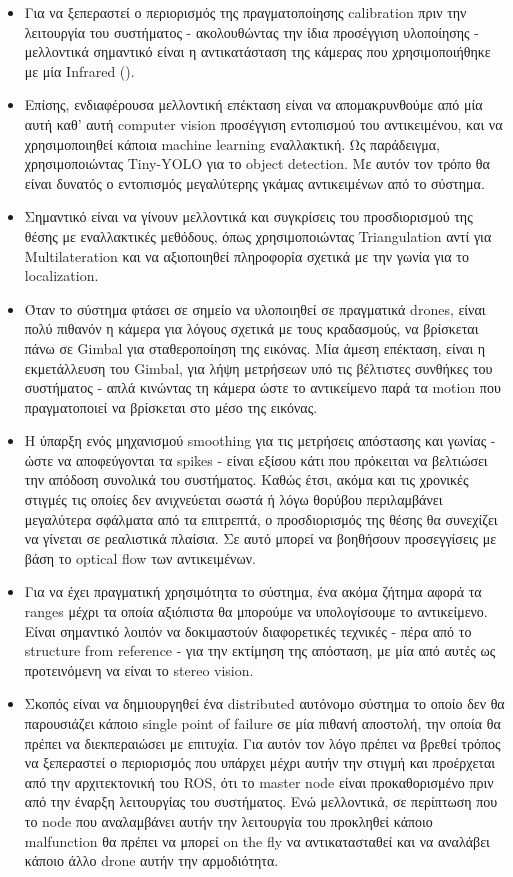 \begin{itemize}
    \item Για να ξεπεραστεί ο περιορισμός της πραγματοποίησης calibration πριν την λειτουργία του συστήματος - ακολουθώντας την ίδια προσέγγιση υ\-λο\-ποίη\-σης - μελλοντικά σημαντικό είναι η αντικατάσταση της κάμερας που χρησιμοποιήθηκε με μία Infrared ().
    \item Επίσης, ενδιαφέρουσα μελλοντική επέκταση είναι να απομακρυνθούμε από μία αυτή καθ' αυτή computer vision προσέγγιση εντοπισμού του αντικειμένου, και να χρησιμοποιηθεί κάποια machine learning εναλλακτική. Ως παράδειγμα, χρησιμοποιώντας Tiny-YOLO για το object detection. Με αυτόν τον τρόπο θα είναι δυνατός ο εντοπισμός μεγαλύτερης γκάμας αντικειμένων από το σύστημα.
    \item Σημαντικό είναι να γίνουν μελλοντικά και συγκρίσεις του προσδιορισμού της θέσης με εναλλακτικές μεθόδους, όπως χρησιμοποιώντας Triangulation αντί για Multilateration και να αξιοποιηθεί πληροφορία σχετικά με την γωνία για το localization.
    \item Όταν το σύστημα φτάσει σε σημείο να υλοποιηθεί σε πραγματικά drones, είναι πολύ πιθανόν η κάμερα για λόγους σχετικά με τους κραδασμούς, να βρίσκεται πάνω σε Gimbal για σταθεροποίηση της εικόνας. Μία άμεση επέκταση, είναι η εκμετάλλευση του Gimbal, για λήψη μετρήσεων υπό τις βέλτιστες συ\-νθή\-κες του συστήματος - απλά κινώντας τη κάμερα ώστε το αντικείμενο παρά τα motion που πραγματοποιεί να βρίσκεται στο μέσο της εικόνας.
    \item Η ύπαρξη ενός μηχανισμού smoothing για τις μετρήσεις απόστασης και γωνίας - ώστε να αποφεύγονται τα spikes - είναι εξίσου κάτι που πρόκειται να βελτιώσει την απόδοση συνολικά του συστήματος. Καθώς έτσι, ακόμα και τις χρονικές στιγμές τις οποίες δεν ανιχνεύεται σωστά ή λόγω θορύβου περιλαμβάνει με\-γα\-λύ\-τε\-ρα σφάλματα από τα επιτρεπτά, ο προσδιορισμός της θέσης θα συνεχίζει να γίνεται σε ρεαλιστικά πλαίσια. Σε αυτό μπορεί να βοηθήσουν προσεγγίσεις με βάση το optical flow των αντικειμένων.
    \item Για να έχει πραγματική χρησιμότητα το σύστημα, ένα ακόμα ζήτημα αφορά τα ranges μέχρι τα οποία αξιόπιστα θα μπορούμε να υπολογίσουμε το αντικείμενο. Είναι σημαντικό λοιπόν να δοκιμαστούν διαφορετικές τεχνικές - πέρα από το structure from reference - για την εκτίμηση της απόσταση, με μία από αυτές ως
    προτεινόμενη να είναι το stereo vision.
    \item Σκοπός είναι να δημιουργηθεί ένα distributed αυτόνομο σύστημα το οποίο δεν θα παρουσιάζει κάποιο single point of failure σε μία πιθανή αποστολή, την οποία θα πρέπει να διεκπεραιώσει με επιτυχία. Για αυτόν τον λόγο πρέπει να βρεθεί τρόπος να ξεπεραστεί ο περιορισμός που υπάρχει μέχρι αυτήν την στιγμή και προέρχεται από την αρχιτεκτονική του ROS, ότι το master node είναι προκαθορισμένο πριν από την έναρξη λειτουργίας του συστήματος. Ενώ μελλοντικά, σε περίπτωση που το node που αναλαμβάνει αυτήν την λειτουργία του προ\-κλη\-θεί κάποιο malfunction θα πρέπει να μπορεί on the fly να αντικατασταθεί και να αναλάβει κάποιο άλλο drone αυτήν την αρμοδιότητα.

\end{itemize}
